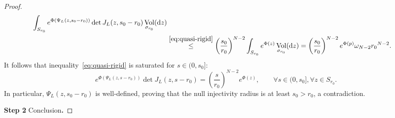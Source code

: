 \documentclass[12pt,a4paper]{amsart}
\theoremstyle{plain}
\theoremstyle{definition}
\numberwithin{equation}{section}
\DeclareMathOperator{\vol}{Vol}
\newcommand{\de}{{\mathrm{d}}}
\newcommand{\gflow}{\Psi}
\begin{document}
\begin{proof}
\begin{align*}
  \int_{S_{r_0}}
  e^{\Phi(\gflow_L(z,s_0-r_0))}
  \det J_L(z,s_0-r_0)
  \vol_{\sigma_{r_0}}(\de z)
 \\
  &
  \overset{\eqref{eq:quasi-rigid}} {\leq}
    \left(\frac{s_{0}}{r_0}\right)^{N-2}
    \int_{S_{r_0}}
  e^{\Phi(z)}
  \vol_{\sigma_{r_0}}(\de z)
    =
    \left(\frac{s_{0}}{r_0}\right)^{N-2}
    e^{\Phi(p)}\omega_{N-2}{r_0}^{N-2}
    .
\end{align*}
%
It follows that inequality~\eqref{eq:quasi-rigid} is
saturated for $s\in (0,s_0]$:
\begin{equation}
  \label{eq:rigid}
  e^{\Phi(\Psi_L(z,s- r_0))} \det J_L(z,s-r_0)
  =
\left(\frac{s}{r_0}\right)^{N-2}e^{\Phi(z)},
\qquad
\forall s\in (0,s_0]
,
\forall z\in S_{r_0}
.
\end{equation}
%
In particular, $\gflow_L(z,s_0-r_0)$ is well-defined, proving that
the null injectivity radius is at least $s_0>r_0$, a contradiction.


\smallskip

\noindent
\textbf{Step 2 }Conclusion\textbf{.}


\end{proof}
\end{document}
